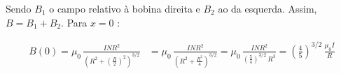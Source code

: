 Sendo $B_1$ o campo relativo à bobina direita e $B_2$ ao da esquerda. Assim, $B = B_1 + B_2$. Para $x = 0$ :


\begin{align*}
	B(0) = \mu_0 \, \frac{I N R^2}{\left(R^2 + \left(\frac{R}{2}\right)^2\right)^{3/2}} & = \mu_0 \, \frac{I N R^2}{\left(R^2 + \frac{R^2}{4}\right)^{3/2}} = \mu_0 \, \frac{I N R^2}{\left(\frac{5}{4}\right)^{3/2} \, R^3} =  \left(\frac{4}{5}\right)^{3/2} \, \frac{\mu_0 I}{R}
\end{align*}

